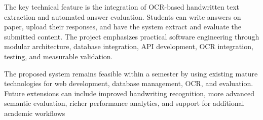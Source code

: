 \documentclass[11pt,a4paper]{article}
\begin{document}
The key technical feature is the integration of OCR-based handwritten text extraction and automated answer evaluation. Students can write answers on paper, upload their responses, and have the system extract and evaluate the submitted content. The project emphasizes practical software engineering through modular architecture, database integration, API development, OCR integration, testing, and measurable validation.

The proposed system remains feasible within a semester by using existing mature technologies for web development, database management, OCR, and evaluation. Future extensions can include improved handwriting recognition, more advanced semantic evaluation, richer performance analytics, and support for additional academic workflows
\end{document}
